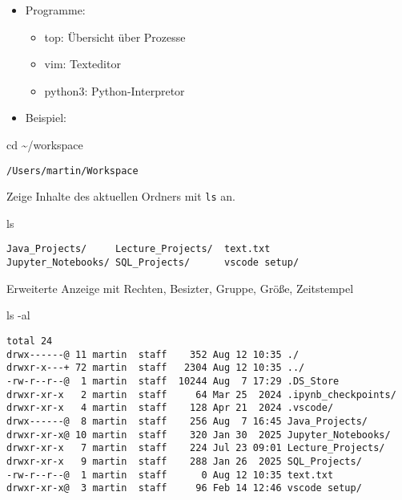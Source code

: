 \documentclass[
  11pt,
  a4paper,
  DIV=11,
  numbers=noendperiod]{scrartcl}
\newenvironment{Shaded}{\begin{snugshade}}{\end{snugshade}}
\newcommand{\NormalTok}[1]{\textcolor[rgb]{0.00,0.23,0.31}{#1}}
\newcommand{\OperatorTok}[1]{\textcolor[rgb]{0.37,0.37,0.37}{#1}}
\providecommand{\tightlist}{%
  \setlength{\itemsep}{0pt}\setlength{\parskip}{0pt}}\usepackage{longtable,booktabs,array}
\begin{document}
\begin{itemize}
\item
  Programme:

  \begin{itemize}
  \tightlist
  \item
    top: Übersicht über Prozesse
  \item
    vim: Texteditor
  \item
    python3: Python-Interpretor
  \end{itemize}
\item
  Beispiel:
\end{itemize}

\begin{Shaded}
\begin{Highlighting}[numbers=left,,]
\NormalTok{cd }\OperatorTok{\textasciitilde{}/}\NormalTok{workspace}
\end{Highlighting}
\end{Shaded}

\begin{verbatim}
/Users/martin/Workspace
\end{verbatim}

Zeige Inhalte des aktuellen Ordners mit \texttt{ls} an.

\begin{Shaded}
\begin{Highlighting}[numbers=left,,]
\NormalTok{ls}
\end{Highlighting}
\end{Shaded}

\begin{verbatim}
Java_Projects/     Lecture_Projects/  text.txt
Jupyter_Notebooks/ SQL_Projects/      vscode setup/
\end{verbatim}

Erweiterte Anzeige mit Rechten, Besizter, Gruppe, Größe, Zeitstempel

\begin{Shaded}
\begin{Highlighting}[numbers=left,,]
\NormalTok{ls }\OperatorTok{{-}}\NormalTok{al}
\end{Highlighting}
\end{Shaded}

\begin{verbatim}
total 24
drwx------@ 11 martin  staff    352 Aug 12 10:35 ./
drwxr-x---+ 72 martin  staff   2304 Aug 12 10:35 ../
-rw-r--r--@  1 martin  staff  10244 Aug  7 17:29 .DS_Store
drwxr-xr-x   2 martin  staff     64 Mar 25  2024 .ipynb_checkpoints/
drwxr-xr-x   4 martin  staff    128 Apr 21  2024 .vscode/
drwx------@  8 martin  staff    256 Aug  7 16:45 Java_Projects/
drwxr-xr-x@ 10 martin  staff    320 Jan 30  2025 Jupyter_Notebooks/
drwxr-xr-x   7 martin  staff    224 Jul 23 09:01 Lecture_Projects/
drwxr-xr-x   9 martin  staff    288 Jan 26  2025 SQL_Projects/
-rw-r--r--@  1 martin  staff      0 Aug 12 10:35 text.txt
drwxr-xr-x@  3 martin  staff     96 Feb 14 12:46 vscode setup/
\end{verbatim}
\end{document}
